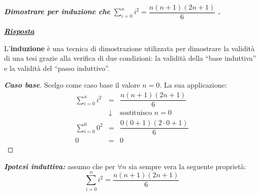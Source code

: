 \documentclass[a4paper]{article}
\newcommand{\dquotes}[1]{``#1''}
\begin{document}
	\textcolor{Red3}{\textbf{\emph{Dimostrare per induzione che }}$\displaystyle\sum_{i=0}^{n} i^{2} = \dfrac{n\left(n+1\right)\left(2n+1\right)}{6}$ \textbf{\emph{.}}}\newline
	
	\noindent
	\textcolor{Green4}{\textbf{\emph{\underline{Risposta}}}}\newline
	
	\noindent
	L'\textbf{induzione} è una tecnica di dimostrazione utilizzata per dimostrare la validità di una tesi grazie alla verifica di due condizioni: la validità della \dquotes{base induttiva} e la validità del \dquotes{passo induttivo}.
	
	\begin{proof}[\textbf{Caso base}]
		Scelgo come caso base il valore $n = 0$. La sua applicazione:
		\begin{equation*}
			\begin{array}{rcl}
				\displaystyle\sum_{i=0}^{n} i^{2} &=& \dfrac{n\left(n+1\right)\left(2n+1\right)}{6} \\ [1.5 em]
				&\downarrow& \text{sostituisco }n=0 \\ [1.5em]
				\displaystyle\sum_{i=0}^{0} 0^{2} &=& \dfrac{0\left(0+1\right)\left(2 \cdot 0+1\right)}{6} \\ [1.5 em]
				0 &=& 0
			\end{array}
		\end{equation*}
	\end{proof}
	
	\noindent
	\textbf{\emph{Ipotesi induttiva:}} assumo che per $\forall n$ sia sempre vera la seguente proprietà:
	\begin{equation*}
		\displaystyle\sum_{i=0}^{n} i^{2} = \dfrac{n\left(n+1\right)\left(2n+1\right)}{6}
	\end{equation*}
	
\end{document}
